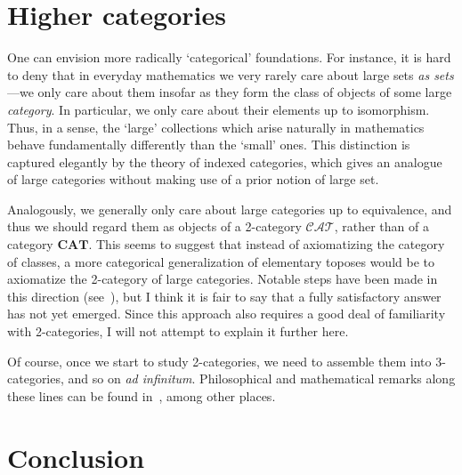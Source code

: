 \documentclass[12pt]{amsart}
\begin{document}
\section{Higher categories}
\label{sec:higher-cats}

One can envision more radically `categorical' foundations.  For
instance, it is hard to deny that in everyday mathematics we very
rarely care about large sets \emph{as sets}---we only care about them
insofar as they form the class of objects of some large
\emph{category}.  In particular, we only care about their elements up
to isomorphism.  Thus, in a sense, the `large' collections which arise
naturally in mathematics behave fundamentally differently than the
`small' ones.  This distinction is captured elegantly by the theory of
indexed categories, which gives an analogue of large categories
without making use of a prior notion of large set.

Analogously, we generally only care about large categories up to
equivalence, and thus we should regard them as objects of a 2-category
$\mathcal{CAT}$, rather than of a category $\mathbf{CAT}$.  This seems
to suggest that instead of axiomatizing the category of classes, a
more categorical generalization of elementary toposes would be to
axiomatize the 2-category of large categories.  Notable steps have
been made in this direction
(see~\cite{street:elem-cosmoi-i,weber:2toposes}), but I think it is
fair to say that a fully satisfactory answer has not yet emerged.
Since this approach also requires a good deal of familiarity with
2-categories, I will not attempt to explain it further here.

Of course, once we start to study 2-categories, we need to assemble
them into 3-categories, and so on \emph{ad infinitum}.  Philosophical
and mathematical remarks along these lines can be found
in~\cite{mak:catfdn}, among other places.



\section{Conclusion}
\label{sec:conclusion}
\end{document}
